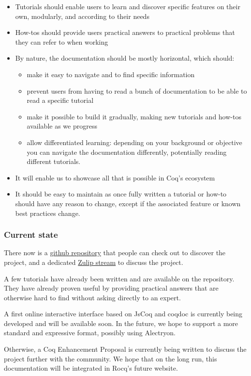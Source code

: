 \documentclass{easychair}
\begin{document}
\begin{itemize}[itemsep=0pt]
  \item Tutorials should enable users to learn and discover specific features on
        their own, modularly, and according to their needs
  \item How-tos should provide users practical answers to practical problems
        that they can refer to when working
  \item By nature, the documentation should be mostly horizontal, which should:
    \begin{itemize}[itemsep=0pt]
      \item make it easy to navigate and to find specific information
      \item prevent users from having to read a bunch of documentation to be
	    able to read a specific tutorial
      \item make it possible to build it gradually, making new tutorials and
	    how-tos available as we progress
      \item allow differentiated learning: depending on your background or
            objective you can navigate the documentation differently,
            potentially reading different tutorials.
    \end{itemize}
  \item It will enable us to showcase all that is possible in Coq's ecosystem
  \item It should be easy to maintain as once fully written a tutorial or how-to
        should have any reason to change, except if the associated feature or
        known best practices change.
\end{itemize}

\subsubsection*{Current state}

There now is a \href{https://github.com/Zimmi48/platform-docs}{github repository}
that people can check out to discover the project, and a dedicated
\href{https://coq.zulipchat.com/#narrow/stream/437203-Platform-docs}{Zulip stream}
to discuss the project.

A few tutorials have already been written and are available on the repository.
They have already proven useful by providing practical answers that are
otherwise hard to find without asking directly to an expert.

A first online interactive interface based on JsCoq and coqdoc is currently
being developed and will be available soon.
In the future, we hope to support a more standard and expressive format,
possibly using Alectryon.

Otherwise, a Coq Enhancement Proposal is currently being written to discuss the
project further with the community.
We hope that on the long run, this documentation will be integrated in Rocq's
future website.

\label{sect:bib}


\end{document}
